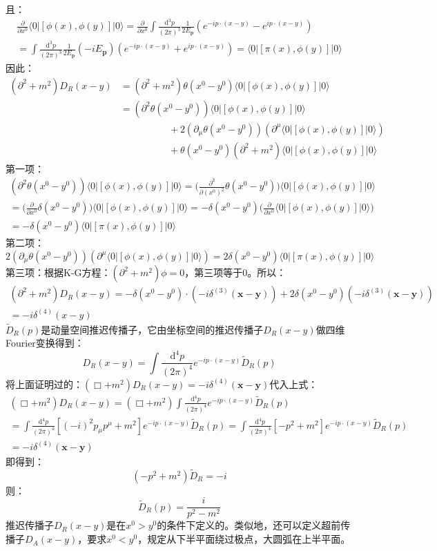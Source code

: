 \documentclass{book}
\begin{document}
且：
\begin{gather*}
\frac{\partial}{\partial x^0}\langle 0|[\phi(x),\phi(y)]|0\rangle=\frac{\partial}{\partial x^0}\int\frac{\mathrm{d}^3p}{(2\pi)^3}\frac1{2E_\mathbf{p}}(e^{-ip\cdot(x-y)}-e^{ip\cdot(x-y)}) \\
=\int\frac{\mathrm{d}^3p}{(2\pi)^3}\frac1{2E_\mathbf{p}}(-iE_\mathbf{p})(e^{-ip\cdot(x-y)}+e^{ip\cdot(x-y)})=\langle0|[\pi(x),\phi(y)]|0\rangle
\end{gather*}
因此：
$$
\begin{aligned}
(\partial^2+m^2)D_R(x-y)&=(\partial^2+m^2)\theta(x^0-y^0)\langle0|\left[\phi(x),\phi(y)\right]|0\rangle\\
&=(\partial^2\theta(x^0-y^0))\langle0|\left[\phi(x),\phi(y)\right]|0\rangle\\&\quad\quad\quad\quad\quad+2(\partial_\mu\theta(x^0-y^0))(\partial^\mu\langle0|\left[\phi(x),\phi(y)\right]|0\rangle)\\&\quad\quad\quad\quad\quad+\theta(x^0-y^0)(\partial^2+m^2)\langle0|\left[\phi(x),\phi(y)\right]|0\rangle
\end{aligned}
$$
第一项：
\begin{gather*}
(\partial^2\theta(x^0-y^0))\langle0|\left[\phi(x),\phi(y)\right]|0\rangle=\Big(\frac{\partial^2}{\partial (x^0)^2}\theta(x^0-y^0)\Big)\langle0|\left[\phi(x),\phi(y)\right]|0\rangle\\
=\Big(\frac{\partial}{\partial x^0}\delta(x^0-y^0)\Big)\langle0|\left[\phi(x),\phi(y)\right]|0\rangle=-\delta(x^0-y^0)\Big(\frac{\partial}{\partial x^0}\langle0|\left[\phi(x),\phi(y)\right]|0\rangle\Big)\\=-\delta(x^0-y^0)\langle0|[\pi(x),\phi(y)]|0\rangle
\end{gather*}
第二项：
$$
2(\partial_\mu\theta(x^0-y^0))(\partial^\mu\langle0|\left[\phi(x),\phi(y)\right]|0\rangle)=2\delta(x^0-y^0)\langle0|[\pi(x),\phi(y)]|0\rangle
$$
第三项：根据K-G方程：$(\partial^2+m^2)\phi=0$，第三项等于$0$。所以：
\begin{gather*}
(\partial^2+m^2)D_R(x-y)=-\delta(x^0-y^0)\cdot (-i\delta^{(3)}(\mathbf{x}-\mathbf{y}))+2\delta(x^0-y^0)(-i\delta^{(3)}(\mathbf{x}-\mathbf{y})) \\
=-i\delta^{(4)}(x-y)
\end{gather*}
$\widetilde{D}_R(p)$是动量空间推迟传播子，它由坐标空间的推迟传播子$D_R(x-y)$做四维Fourier变换得到：
$$
D_{R}(x-y)=\int\frac{\mathrm{d}^4p}{(2\pi)^4}e^{-ip\cdot(x-y)}\widetilde{D}_R(p)
$$
将上面证明过的：$(\Box+m^2)D_R(x-y)=-i\delta^{(4)}(\mathbf{x}-\mathbf{y})$代入上式：
\begin{gather*}
(\Box+m^2)D_R(x-y)=(\Box+m^2)\int\frac{\mathrm{d}^4p}{(2\pi)^4}e^{-ip\cdot(x-y)}\widetilde{D}_R(p)\\=\int\frac{\mathrm{d}^4p}{(2\pi)^4}[(-i)^2p_\mu p^\mu+m^2]e^{-ip\cdot(x-y)}\widetilde{D}_R(p)=\int\frac{\mathrm{d}^4p}{(2\pi)^4}[-p^2+m^2]e^{-ip\cdot(x-y)}\widetilde{D}_R(p)\\=-i\delta^{(4)}(\mathbf{x}-\mathbf{y})
\end{gather*}
即得到：
$$
(-p^2+m^2)\widetilde{D}_R=-i
$$
则：
$$
\widetilde{D}_R(p)=\frac{i}{p^2-m^2}
$$
推迟传播子$D_R(x-y)$是在$x^0>y^0$的条件下定义的。类似地，还可以定义超前传播子$D_A(x-y)$，要求$x^0<y^0$，规定从下半平面绕过极点，大圆弧在上半平面。
\end{document}
